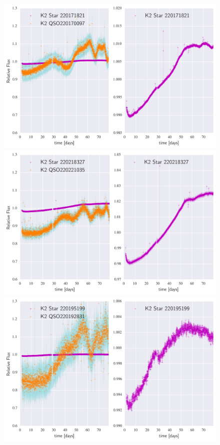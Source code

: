 \documentclass[a4paper,fleqn,usenatbib]{mnras}
\begin{document}
        	        	
        	   \begin{figure}
 	\includegraphics[width=\columnwidth]{220170097NearestNeighbor.png}
 	\includegraphics[width=\columnwidth]{220221035NearestNeighbor.png}
 	\includegraphics[width=\columnwidth]{220192831NearestNeighbor.png}
        		\caption{}
        		\label{fig:example_figure}
        		\end{figure}          
        	
\end{document}
